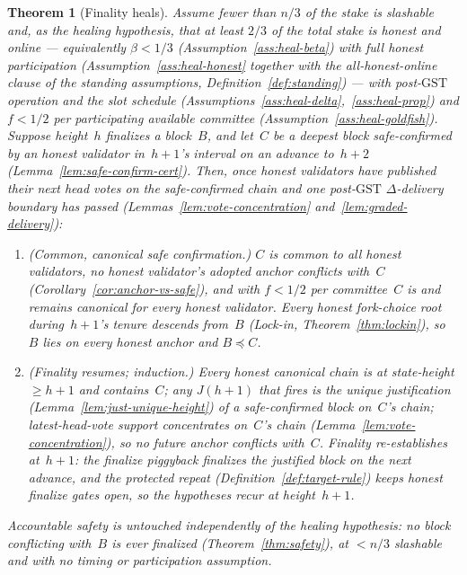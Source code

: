 \ifx\litemode\undefined\documentclass{article}\fi
\newcommand{\GST}{\ensuremath{\mathrm{GST}}\xspace}
\theoremstyle{plain}
\newtheorem{theorem}{Theorem}
\theoremstyle{definition}
\theoremstyle{remark}
\begin{document}
\begin{theorem}[Finality heals]\label{thm:healing-safety}
Assume fewer than \(n/3\) of the stake is slashable and, as the \emph{healing
hypothesis}, that \emph{at least \(2/3\) of the total stake is honest and online}
--- equivalently \(\beta < 1/3\) (Assumption~\ref{ass:heal-beta}) with full honest
participation (Assumption~\ref{ass:heal-honest} together with the
all-honest-online clause of the standing assumptions,
Definition~\ref{def:standing}) --- with post-\GST{} operation and the slot schedule
(Assumptions~\ref{ass:heal-delta},~\ref{ass:heal-prop}) and \(f<1/2\) per
participating available committee (Assumption~\ref{ass:heal-goldfish}).  Suppose
height~\(h\) finalizes a block~\(B\), and let~\(C\) be a deepest block
safe-confirmed by an honest validator in~\(h+1\)'s interval on an advance
to~\(h+2\) (Lemma~\ref{lem:safe-confirm-cert}).  Then, once honest validators
have published their next head votes on the safe-confirmed chain and one
post-\GST{} \(\Delta\)-delivery boundary has passed
(Lemmas~\ref{lem:vote-concentration} and~\ref{lem:graded-delivery}):
\begin{enumerate}[label=(\arabic*)]
  \item \emph{(Common, canonical safe confirmation.)}  \(C\) is common to all
    honest validators, no honest validator's adopted anchor conflicts with~\(C\)
    (Corollary~\ref{cor:anchor-vs-safe}), and with \(f<1/2\) per committee~\(C\)
    is and remains canonical for every honest validator.  Every honest fork-choice
    root during~\(h+1\)'s tenure descends from~\(B\) (Lock-in,
    Theorem~\ref{thm:lockin}), so~\(B\) lies on every honest anchor and
    \(B \preceq C\).
  \item \emph{(Finality resumes; induction.)}  Every honest canonical chain is at
    state-height \(\geq h+1\) and contains~\(C\); any \(J(h+1)\) that fires is the
    unique justification (Lemma~\ref{lem:just-unique-height}) of a safe-confirmed
    block on~\(C\)'s chain; latest-head-vote support concentrates on~\(C\)'s chain
    (Lemma~\ref{lem:vote-concentration}), so no future anchor conflicts with~\(C\).
    Finality re-establishes at~\(h+1\): the finalize piggyback finalizes the
    justified block on the next advance, and the protected repeat
    (Definition~\ref{def:target-rule}) keeps honest finalize gates open, so the
    hypotheses recur at height~\(h+1\).
\end{enumerate}
Accountable safety is untouched independently of the healing hypothesis: no block
conflicting with~\(B\) is ever finalized (Theorem~\ref{thm:safety}), at
\(<n/3\) slashable and with no timing or participation assumption.
\end{theorem}
\end{document}
